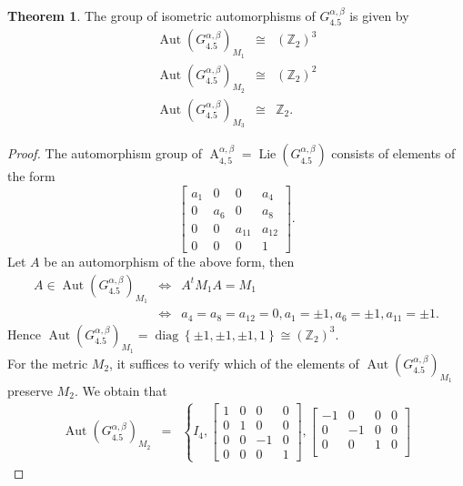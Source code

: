 \documentclass[12pt,a4paper,twoside]{article}
\theoremstyle{definition}
\newtheorem{theorem}{Theorem}[section]
\begin{document}
\begin{theorem}
The group of isometric automorphisms of $G_{4.5}^{\alpha, \beta}$ is given by
\begin{eqnarray*}
\operatorname{Aut}\left(G_{4.5}^{\alpha, \beta}\right)_{M_1}  &\cong& (\mathbb{Z}_2)^3\\
\operatorname{Aut}\left(G_{4.5}^{\alpha, \beta}\right)_{M_2}  &\cong& (\mathbb{Z}_2)^2\\
\operatorname{Aut}\left(G_{4.5}^{\alpha, \beta}\right)_{M_3}  &\cong& \mathbb{Z}_2.
\end{eqnarray*}
\end{theorem}
\begin{proof}
The automorphism group of $\operatorname{A}_{4, 5}^{\alpha, \beta} = \operatorname{Lie}(G_{4.5}^{\alpha, \beta})$ consists of elements of the form \cite{christodoulakis2003automorphisms}
$$\begin{bmatrix}
a_1 & 0 & 0 & a_4\\
0 & a_6 & 0& a_8\\
0 & 0 & a_{11} & a_{12}\\
0 & 0 & 0 & 1
\end{bmatrix}.$$
Let $A$ be an automorphism of the above form, then
\begin{eqnarray*}
A \in \operatorname{Aut}\left(G_{4.5}^{\alpha, \beta}\right)_{M_1} &\Leftrightarrow& A^tM_1A = M_1\\
&\Leftrightarrow& a_4 = a_8 = a_{12} = 0, a_1 = \pm1, a_6 = \pm1, a_{11} = \pm1.
\end{eqnarray*}
Hence $\operatorname{Aut}\left(G_{4.5}^{\alpha, \beta}\right)_{M_1} = \operatorname{diag}\left\lbrace \pm1, \pm1, \pm1, 1\right\rbrace \cong \left(\mathbb{Z}_2\right)^3$.\\
For the metric $M_2$, it suffices to verify which of the elements of $\operatorname{Aut}\left(G_{4.5}^{\alpha, \beta}\right)_{M_1}$ preserve $M_2$. We obtain that
\begin{eqnarray*}
\operatorname{Aut}\left(G_{4.5}^{\alpha, \beta}\right)_{M_2} &=& \left\lbrace I_4, \begin{bmatrix}
1 & 0 & 0 & 0\\
0 & 1 & 0 & 0\\
0 & 0 & -1 & 0\\
0 & 0 & 0 & 1
\end{bmatrix}, \begin{bmatrix}
-1 & 0 & 0 & 0\\
0 & -1 & 0 & 0\\
0 & 0 & 1 & 0\\

\end{bmatrix}
\end{eqnarray*}
\end{proof}
\end{document}
